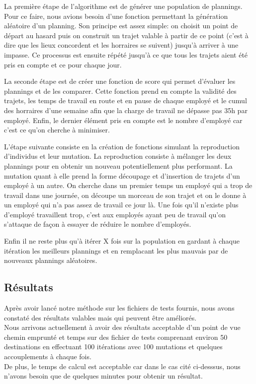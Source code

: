 \documentclass{report}
\begin{document}
La première étape de l'algorithme est de générer une population de plannings. Pour ce faire, nous avions besoin d'une
fonction permettant la génération aléatoire d'un planning. Son principe est assez simple: on choisit un point de départ
au hasard puis on construit un trajet valable à partir de ce point (c'est à dire que les lieux concordent et les
horraires se suivent) jusqu'à arriver à une impasse. Ce processus est ensuite répété jusqu'à ce que tous les trajets
aient été pris en compte et ce pour chaque jour.

La seconde étape est de créer une fonction de score qui permet d'évaluer les plannings et de les comparer. Cette
fonction prend en compte la validité des trajets, les temps de travail en route et en pause de chaque employé et le cumul des horraires
d'une semaine afin que la charge de travail ne dépasse pas 35h par employé. Enfin, le dernier élément pris en compte est
le nombre d'employé car c'est ce qu'on cherche à minimiser.

L'étape suivante consiste en la création de fonctions simulant la reproduction d'individus et leur mutation. La
reproduction consiste à mélanger les deux plannings pour en obtenir un nouveau potentiellement plus performant. La
mutation quant à elle prend la forme découpage et d'insertion de trajets d'un employé à un autre. On cherche dans un
premier temps un employé qui a trop de travail dans une journée, on découpe un morceau de son trajet et on le donne à un
employé qui n'a pas assez de travail ce jour là. Une fois qu'il n'existe plus d'employé travaillent trop, c'est aux
employés ayant peu de travail qu'on s'attaque de façon à essayer de réduire le nombre d'employés.

Enfin il ne reste plus qu'à itérer X fois sur la population en gardant à chaque itération les meilleurs plannings et en
remplacant les plus mauvais par de nouveaux plannings aléatoires.

\subsection{Résultats}
Après avoir lancé notre méthode sur les fichiers de tests fournis, nous avons constaté des résultats valables mais qui peuvent être améliorés.\\

Nous arrivons actuellement à avoir des résultats acceptable d'un point de vue chemin emprunté et temps sur des fichier de tests comprenant
environ 50 destinations en effectuant 100 itérations avec 100 mutations et quelques accouplements à chaque fois.\\
De plus, le temps de calcul est acceptable car dans le cas cité ci-desssus, nous n'avons besoin que de quelques minutes
pour obtenir un résultat.
\end{document}
